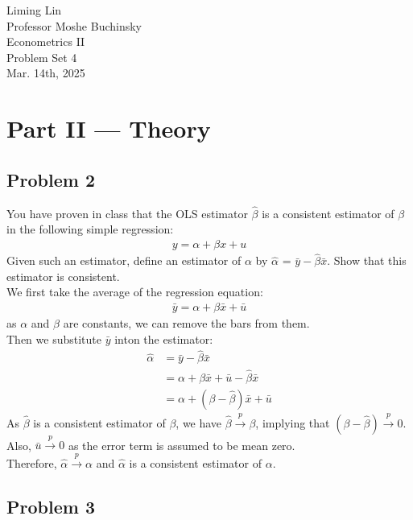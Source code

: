 \documentclass[12pt]{article}
\begin{document}
\begin{flushleft}
Liming Lin\\
Professor Moshe Buchinsky\\
Econometrics II\\
Problem Set 4\\
Mar. 14th, 2025\\
\section*{Part II --- Theory}
\subsection*{Problem 2}
You have proven in class that the OLS estimator $\hat{\beta}$ is a consistent estimator of $\beta$ in the following simple regression:
\begin{align*}
    y=\alpha+\beta x+u
\end{align*}
Given such an estimator, define an estimator of $\alpha$ by $\hat{\alpha}$ = $\bar{y}-\hat{\beta} \bar{x}$. Show that this estimator is consistent.\\
We first take the average of the regression equation:
\begin{align*}
    \bar{y}=\alpha+\beta\bar{x}+\bar{u}
\end{align*}
as $\alpha$ and $\beta$ are constants, we can remove the bars from them.\\
Then we substitute $\bar{y}$ inton the estimator:
\begin{align*}
    \hat{\alpha}&=\bar{y}-\hat{\beta}\bar{x}\\
    &=\alpha+\beta\bar{x}+\bar{u}-\hat{\beta}\bar{x}\\
    &=\alpha+(\beta-\hat{\beta})\bar{x}+\bar{u}
\end{align*}
As $\hat{\beta}$ is a consistent estimator of $\beta$, we have $\hat{\beta}\xrightarrow{p}\beta$, implying that $(\beta-\hat{\beta})\xrightarrow{p}0$.\\
Also, $\bar{u}\xrightarrow{p}0$ as the error term is assumed to be mean zero.\\
Therefore, $\hat{\alpha}\xrightarrow{p}\alpha$ and $\hat{\alpha}$ is a consistent estimator of $\alpha$.\\

\subsection*{Problem 3}


\end{flushleft}
\end{document}
